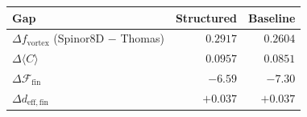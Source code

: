 \begin{tabular}{lrr}
\toprule
Gap & Structured & Baseline \\
\midrule
$\Delta f_{\mathrm{vortex}}$ (Spinor8D $-$ Thomas) & $\mathbf{0.2917}$ & $0.2604$ \\
$\Delta\langle C \rangle$ & $0.0957$ & $0.0851$ \\
$\Delta\mathcal{F}_{\mathrm{fin}}$ & $-6.59$ & $-7.30$ \\
$\Delta d_{\mathrm{eff,fin}}$ & $+0.037$ & $+0.037$ \\
\bottomrule
\end{tabular}
